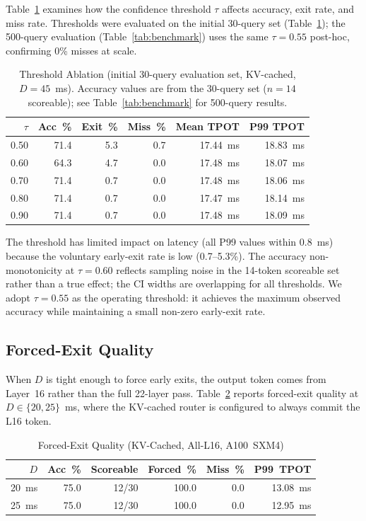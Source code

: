 \documentclass[conference]{IEEEtran}
\begin{document}
Table~\ref{tab:threshold} examines how the confidence threshold $\tau$
affects accuracy, exit rate, and miss rate.
Thresholds were evaluated on the initial 30-query set (Table~\ref{tab:threshold});
the 500-query evaluation (Table~\ref{tab:benchmark}) uses the same
$\tau{=}0.55$ post-hoc, confirming 0\% misses at scale.

\begin{table}[htbp]
\caption{Threshold Ablation (initial 30-query evaluation set, KV-cached, $D=45$~ms).
         Accuracy values are from the 30-query set ($n{=}14$ scoreable);
         see Table~\ref{tab:benchmark} for 500-query results.}
\centering
\setlength{\tabcolsep}{3pt}
\begin{tabular}{@{}rrrrrr@{}}
\toprule
$\tau$ & Acc~\% & Exit~\% & Miss~\% & Mean TPOT & P99 TPOT \\
\midrule
0.50 & 71.4 & 5.3 & 0.7  & 17.44~ms & 18.83~ms \\
0.60 & 64.3 & 4.7 & 0.0  & 17.48~ms & 18.07~ms \\
0.70 & 71.4 & 0.7 & 0.0  & 17.48~ms & 18.06~ms \\
0.80 & 71.4 & 0.7 & 0.0  & 17.47~ms & 18.14~ms \\
0.90 & 71.4 & 0.7 & 0.0  & 17.48~ms & 18.09~ms \\
\bottomrule
\end{tabular}
\label{tab:threshold}
\end{table}

The threshold has limited impact on latency (all P99 values within
0.8~ms) because the voluntary early-exit rate is low (0.7--5.3\%).
The accuracy non-monotonicity at $\tau=0.60$ reflects sampling noise
in the 14-token scoreable set rather than a true effect; the CI widths
are overlapping for all thresholds.
We adopt $\tau=0.55$ as the operating threshold: it achieves the maximum
observed accuracy while maintaining a small non-zero early-exit rate.

\subsection{Forced-Exit Quality}
\label{sec:forced}

When $D$ is tight enough to force early exits, the output token comes
from Layer~16 rather than the full 22-layer pass.
Table~\ref{tab:forced} reports forced-exit quality at $D \in \{20, 25\}$~ms,
where the KV-cached router is configured to always commit the L16 token.

\begin{table}[htbp]
\caption{Forced-Exit Quality (KV-Cached, All-L16, A100~SXM4)}
\centering
\setlength{\tabcolsep}{3pt}
\begin{tabular}{@{}rrrrrr@{}}
\toprule
$D$ & Acc~\% & Scoreable & Forced~\% & Miss~\% & P99~TPOT \\
\midrule
20~ms & 75.0 & 12/30 & 100.0 & 0.0 & 13.08~ms \\
25~ms & 75.0 & 12/30 & 100.0 & 0.0 & 12.95~ms \\
\bottomrule
\end{tabular}
\label{tab:forced}
\end{table}
\end{document}
